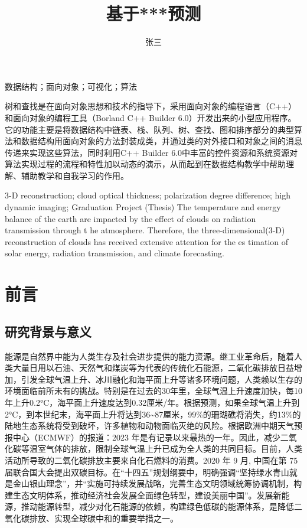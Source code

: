 \documentclass[supercite]{qustthesis}
\title{基于***预测}
\author{张三}
\begin{document}
	\maketitle
	\begin{cnabstract}{数据结构；面向对象；可视化；算法}
		
		树和查找是在面向对象思想和技术的指导下，采用面向对象的编程语言（C++）和面向对象的编程工具（Borland C++ Builder 6.0）开发出来的小型应用程序。它的功能主要是将数据结构中链表、栈、队列、树、查找、图和排序部分的典型算法和数据结构用面向对象的方法封装成类，并通过类的对外接口和对象之间的消息传递来实现这些算法，同时利用C++ Builder 6.0中丰富的控件资源和系统资源对算法实现过程的流程和特性加以动态的演示，从而起到在数据结构教学中帮助理解、辅助教学和自我学习的作用。		
	\end{cnabstract}
	\begin{enabstract}{3-D reconstruction; cloud optical thickness; polarization degree difference; high dynamic imaging; Graduation Project (Thesis)}
	The temperature and energy balance of the earth are impacted by the effect of clouds on radiation transmission through t he atmosphere. Therefore, the three-dimensional(3-D) reconstruction of clouds has received extensive attention for the es timation of solar energy, radiation transmission, and climate forecasting. 
	\end{enabstract}

\tableofcontents

\section{前言}
\subsection{研究背景与意义}
能源是自然界中能为人类生存及社会进步提供的能力资源。继工业革命后，随着人类大量日用以石油、天然气和煤炭等为代表的传统化石能源，二氧化碳排放日益增加，引发全球气温上升、冰川融化和海平面上升等诸多环境问题，人类赖以生存的环境面临前所未有的挑战。特别是在过去的30年里，全球气温上升速度加快，每10年上升0.2°C，海平面上升速度达到0.32厘米/年。根据预测，如果全球气温上升到2°C，到本世纪末，海平面上升将达到36\~{}87厘米，99\%的珊瑚礁将消失，约13\%的陆地生态系统将受到破坏，许多植物和动物面临灭绝的风险\cite{schurer2017importance,millar2017emission,portner2019ocean}。根据欧洲中期天气预报中心（ECMWF）的报道：2023 年是有记录以来最热的一年\cite{ECMWF_2023_hottest}。因此，减少二氧化碳等温室气体的排放，限制全球气温上升已成为全人类的共同目标。目前，人类活动所导致的二氧化碳排放主要来自化石燃料的消费。2020 年 9 月, 中国在第 75 届联合国大会提出双碳目标。在“十四五”规划纲要中，明确强调“坚持绿水青山就是金山银山理念”，并“实施可持续发展战略，完善生态文明领域统筹协调机制，构建生态文明体系，推动经济社会发展全面绿色转型，建设美丽中国”。发展新能源，推动能源转型，减少对化石能源的依赖，构建绿色低碳的能源体系，是降低二氧化碳排放、实现全球碳中和的重要举措之一。
\end{document}

